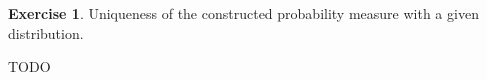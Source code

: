 \documentclass[11pt,oneside]{article}
\numberwithin{equation}{section}
\theoremstyle{definition}
\newtheorem{exercise}{Exercise}
\begin{document}
\begin{exercise}
  Uniqueness of the constructed probability measure with a given distribution.  
\end{exercise}
\begin{solution}
TODO
\end{solution}


\begin{comment}
\begin{exercise}
  problem
\end{exercise}
\begin{solution}
\begin{enumerate}[(a)]
\item
  first answer
\end{enumerate}
\end{solution}
\end{comment}
\end{document}

